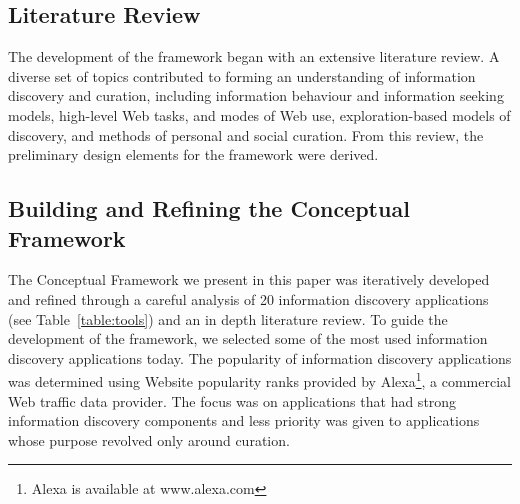 \documentclass[review]{elsarticle}
\begin{document}
{\subsection{Literature Review}
\label{subsection:lit_review}
The development of the framework began with an extensive literature review. A diverse set of topics contributed to forming an understanding of information discovery and curation, including information behaviour and information seeking models, high-level Web tasks, and modes of Web use, exploration-based models of discovery, and methods of personal and social curation. From this review, the preliminary design elements for the framework were derived.
}%

{\subsection{Building and Refining the Conceptual Framework}
\label{subsection:building}
The Conceptual Framework we present in this paper was iteratively developed and refined through a careful analysis of 20 information discovery applications (see Table~\ref{table:tools}) and an in depth literature review.   
%
To guide the development of the framework, we selected some of the most used information discovery applications today.
The popularity of information discovery applications was determined using Website popularity ranks provided by Alexa\footnote[1]{Alexa is available at www.alexa.com}, a commercial Web traffic data provider. The focus was on applications that had strong information discovery components and less priority was given to applications whose purpose revolved only around curation.
%
}
\end{document}
